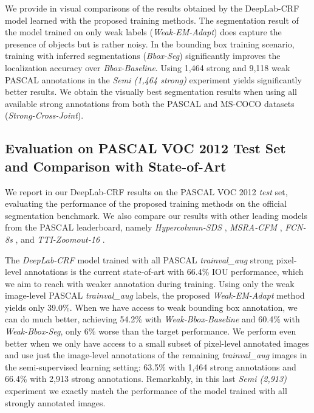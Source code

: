 We provide in  visual comparisons of the
results obtained by the DeepLab-CRF model learned with the proposed
training methods. The segmentation result of the model trained on only
weak labels (\textsl{Weak-EM-Adapt}) does capture the presence of
objects but is rather noisy. In the bounding box training scenario,
training with inferred segmentations (\textsl{Bbox-Seg}) significantly
improves the localization accuracy over \textsl{Bbox-Baseline}. Using
1,464 strong and 9,118 weak PASCAL annotations in the \textsl{Semi
  (1,464 strong)} experiment yields significantly better results. We
obtain the visually best segmentation results when using all available
strong annotations from both the PASCAL and MS-COCO datasets
(\textsl{Strong-Cross-Joint}).

\subsection{Evaluation on PASCAL VOC 2012 Test Set and Comparison with State-of-Art}

We report in  our DeepLab-CRF results on the
PASCAL VOC 2012 \textsl{test} set, evaluating the performance of the
proposed training methods on the official segmentation benchmark. We
also compare our results with other leading models from the PASCAL
leaderboard, namely \textsl{Hypercolumn-SDS}
\citep{hariharan2014hypercolumns}, \textsl{MSRA-CFM}
\citep{dai2014convolutional}, \textsl{FCN-8s} \citep{long2014fully},
and \textsl{TTI-Zoomout-16} \citep{mostajabi2014feedforward}.

The \textsl{DeepLab-CRF} model \citep{chen2014semantic} trained with
all PASCAL \textsl{trainval\_aug} strong pixel-level annotations is
the current state-of-art with 66.4\% IOU performance, which we aim to
reach with weaker annotation during training. Using only the weak
image-level PASCAL \textsl{trainval\_aug} labels, the proposed
\textsl{Weak-EM-Adapt} method yields only 39.0\%. When we have access
to weak bounding box annotation, we can do much better, achieving
54.2\% with \textsl{Weak-Bbox-Baseline} and 60.4\% with
\textsl{Weak-Bbox-Seg}, only 6\% worse than the target
performance. We perform even better when we only have access to a
small subset of pixel-level annotated images and use just the
image-level annotations of the remaining \textsl{trainval\_aug}
images in the semi-supervised learning setting: 63.5\% with 1,464
strong annotations and 66.4\% with 2,913 strong
annotations. Remarkably, in this last \textsl{Semi (2,913)} experiment
we exactly match the performance of the model trained with all
strongly annotated images.

